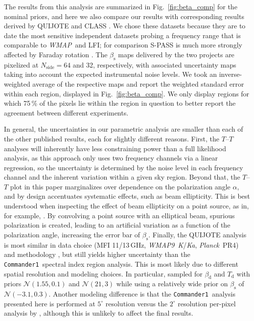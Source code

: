 \documentclass[twocolumn]{../../common/aa}
\def\WMAP{\emph{WMAP}}
\def\WMAPnine{\emph{WMAP9}}
\def\Planck{\emph{Planck}}
\def\commanderone{\texttt{Commander1}}
\newcommand{\K}[0]{\textit K}
\newcommand{\Ka}[0]{\textit{Ka}}
\begin{document}
The results from this analysis are summarized in Fig.~\ref{fig:beta_comp} for the nominal priors, and here we also compare our results with corresponding results derived by QUIJOTE \citep{QUIJOTE_VIII} and CLASS \citep{eimer2023}. We chose these datasets because they are to date the most sensitive independent datasets probing a frequency range that is comparable to \WMAP\ and LFI; for comparison S-PASS is much more strongly affected by Faraday rotation \citep{krachmalnicoff2018,fuskeland:2019}. The $\beta_\mathrm s$ maps delivered by the two projects are pixelized at $N_\mathrm{side}=64$ and 32, respectively, with associated uncertainty maps taking into account the expected instrumental noise levels. We took an inverse-weighted average of the respective maps and report the weighted standard error within each region, displayed in Fig.~\ref{fig:beta_comp}. We only display regions for which 75\,\% of the pixels lie within the region in question to better report the agreement between different experiments.


In general, the uncertainties in our parametric analysis are smaller than each of the other published results, each for slightly different reasons. First, the $T$--$T$ analyses will inherently have less constraining power than a full likelihood analysis, as this approach only uses two frequency channels via a linear regression, so the uncertainty is determined by the noise level in each frequency channel and the inherent variation within a given sky region. Beyond that, the $T$--$T$ plot in this paper marginalizes over dependence on the polarization angle $\alpha$, and by design accentuates systematic effects, such as beam ellipticity. 
This is best understood when inspecting the effect of beam ellipticity on a point source, as in, for example, \citet{wehus:2013}. By convolving a point source with an elliptical beam, spurious polarization is created, leading to an artificial variation as a function of the polarization angle, increasing the error bar of $\beta_\mathrm{s}$.
Finally, the QUIJOTE analysis is most similar in data choice (MFI 11/13\,GHz, \WMAPnine\ \K/\Ka, \Planck\ PR4) and methodology \citep[\texttt{B-SeCRET};][]{b-secret}, but still yields higher uncertainty than the \commanderone\ spectral index region analysis. This is most likely due to different spatial resolution and modeling choices. In particular,  \citet{QUIJOTE_VIII} sampled for $\beta_\mathrm d$ and $T_\mathrm{d}$ with priors $\mathcal N(1.55,0.1)$ and $\mathcal N(21,3)$ while using a relatively wide prior on $\beta_\mathrm s$ of $\mathcal N(-3.1, 0.3)$.
Another modeling difference is that the \commanderone\ analysis presented here is performed at $5^\circ$ resolution versus the $2^\circ$ resolution per-pixel analysis by \citet{QUIJOTE_VIII}, although this is unlikely to affect the final results.
\end{document}
